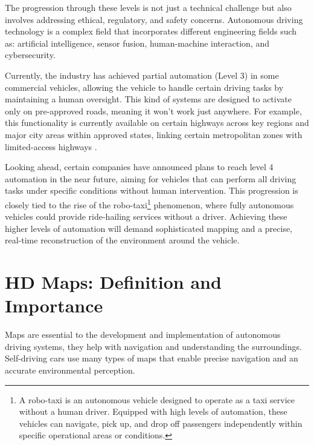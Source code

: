 The progression through these levels is not just a technical challenge but also involves addressing ethical, regulatory, and safety concerns. Autonomous driving technology is a complex field that incorporates different engineering fields such as: artificial intelligence, sensor fusion, human-machine interaction, and cybersecurity. 

Currently, the industry has achieved partial automation (Level 3) in some commercial vehicles, allowing the vehicle to handle certain driving tasks by maintaining a human oversight. This kind of systems are designed to activate only on pre-approved roads, meaning it won’t work just anywhere. For example, this functionality is currently available on certain highways across key regions and major city areas within approved states, linking certain metropolitan zones with limited-access highways \cite{bmw2024}.

\begin{samepage}
Looking ahead, certain companies have announced plans to reach level 4 automation in the near future, aiming for vehicles that can perform all driving tasks under specific conditions without human intervention. This progression is closely tied to the rise of the robo-taxi\footnote{A robo-taxi is an autonomous vehicle designed to operate as a taxi service without a human driver. Equipped with high levels of automation, these vehicles can navigate, pick up, and drop off passengers independently within specific operational areas or conditions.} phenomenon, where fully autonomous vehicles could provide ride-hailing services without a driver. Achieving these higher levels of automation will demand sophisticated mapping and a precise, real-time reconstruction of the environment around the vehicle.
\end{samepage}

\section{HD Maps: Definition and Importance}

Maps are essential to the development and implementation of autonomous driving systems, they help with navigation and understanding the surroundings. Self-driving cars use many types of maps that enable precise navigation and an accurate environmental perception. 

